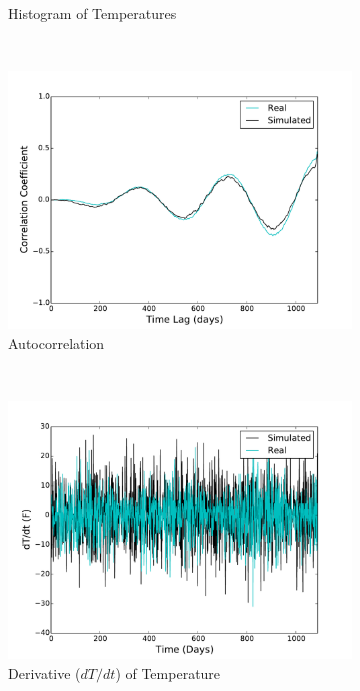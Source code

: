 \documentclass[11pt, letterpaper]{article}
\begin{document}
\begin{figure}[H]
\begin{subfigure}[b]{0.45\textwidth}
    \caption{Histogram of Temperatures}
  \end{subfigure}
  ~
  \begin{subfigure}[b]{0.45\textwidth}
    \includegraphics[width=\textwidth]{figures/sim_temp_autocorr.pdf}
    \caption{\label{fig:analysis-autocorr} Autocorrelation}
  \end{subfigure}
  ~
  \begin{subfigure}[b]{0.45\textwidth}
    \includegraphics[width=\textwidth]{figures/sim_vel.pdf}
    \caption{\label{fig:analysis-autocorr} Derivative ($dT/dt$) of Temperature}
  \end{subfigure}
  ~
  \begin{subfigure}[b]{0.45\textwidth}

\end{subfigure}
\end{figure}
\end{document}
